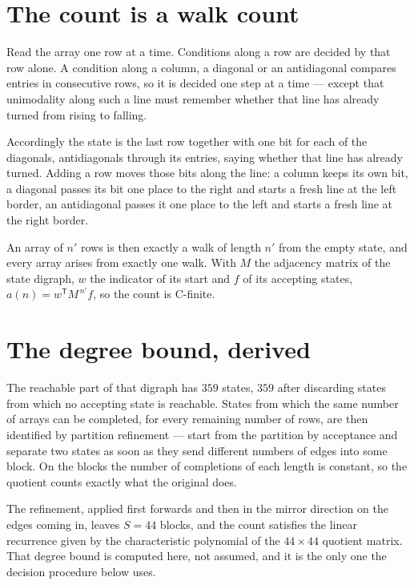 \documentclass[11pt]{article}
\theoremstyle{definition}
\begin{document}
\section{The count is a walk count}

Read the array one row at a time. Conditions along a row are decided by that row alone. A condition along a column, a diagonal or an antidiagonal compares entries in consecutive rows, so it is decided one step at a time --- except that unimodality along such a line must remember whether that line has already turned from rising to falling.

Accordingly the state is the last row together with one bit for each of the diagonals, antidiagonals through its entries, saying whether that line has already turned. Adding a row moves those bits along the line: a column keeps its own bit, a diagonal passes its bit one place to the right and starts a fresh line at the left border, an antidiagonal passes it one place to the left and starts a fresh line at the right border.

An array of $n'$ rows is then exactly a walk of length $n'$ from the empty state, and every array arises from exactly one walk. With $M$ the adjacency matrix of the state digraph, $w$ the indicator of its start and $f$ of its accepting states, $a(n) = w^{\mathsf T}M^{\,n'}f$, so the count is C-finite.

\section{The degree bound, derived}

The reachable part of that digraph has $359$ states, $359$ after discarding states from which no accepting state is reachable. States from which the same number of arrays can be completed, for every remaining number of rows, are then identified by partition refinement --- start from the partition by acceptance and separate two states as soon as they send different numbers of edges into some block. On the blocks the number of completions of each length is constant, so the quotient counts exactly what the original does.

The refinement, applied first forwards and then in the mirror direction on the edges coming in, leaves $S = 44$ blocks, and the count satisfies the linear recurrence given by the characteristic polynomial of the $44 \times 44$ quotient matrix. That degree bound is computed here, not assumed, and it is the only one the decision procedure below uses.
\end{document}

